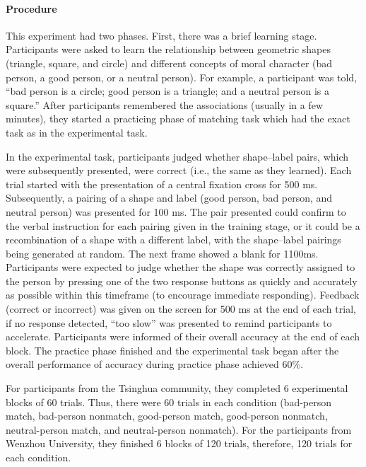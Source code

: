 \documentclass[
  english,
  man]{apa6}
\let\oldparagraph\paragraph
\renewcommand{\paragraph}[1]{\oldparagraph{#1}\mbox{}}
\begin{document}
\hypertarget{procedure}{%
\paragraph{Procedure}\label{procedure}}

This experiment had two phases. First, there was a brief learning stage. Participants were asked to learn the relationship between geometric shapes (triangle, square, and circle) and different concepts of moral character (bad person, a good person, or a neutral person). For example, a participant was told, \enquote{bad person is a circle; good person is a triangle; and a neutral person is a square.} After participants remembered the associations (usually in a few minutes), they started a practicing phase of matching task which had the exact task as in the experimental task.

In the experimental task, participants judged whether shape--label pairs, which were subsequently presented, were correct (i.e., the same as they learned). Each trial started with the presentation of a central fixation cross for 500 ms. Subsequently, a pairing of a shape and label (good person, bad person, and neutral person) was presented for 100 ms. The pair presented could confirm to the verbal instruction for each pairing given in the training stage, or it could be a recombination of a shape with a different label, with the shape--label pairings being generated at random. The next frame showed a blank for 1100ms. Participants were expected to judge whether the shape was correctly assigned to the person by pressing one of the two response buttons as quickly and accurately as possible within this timeframe (to encourage immediate responding). Feedback (correct or incorrect) was given on the screen for 500 ms at the end of each trial, if no response detected, \enquote{too slow} was presented to remind participants to accelerate. Participants were informed of their overall accuracy at the end of each block. The practice phase finished and the experimental task began after the overall performance of accuracy during practice phase achieved 60\%.

For participants from the Tsinghua community, they completed 6 experimental blocks of 60 trials. Thus, there were 60 trials in each condition (bad-person match, bad-person nonmatch, good-person match, good-person nonmatch, neutral-person match, and neutral-person nonmatch). For the participants from Wenzhou University, they finished 6 blocks of 120 trials, therefore, 120 trials for each condition.
\end{document}
